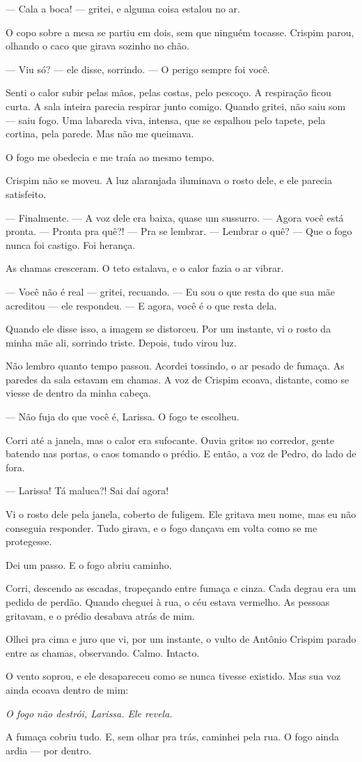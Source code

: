 — Cala a boca! — gritei, e alguma coisa estalou no ar.

O copo sobre a mesa se partiu em dois, sem que ninguém tocasse.  
Crispim parou, olhando o caco que girava sozinho no chão.

— Viu só? — ele disse, sorrindo. — O perigo sempre foi você.

\medskip

Senti o calor subir pelas mãos, pelas costas, pelo pescoço.  
A respiração ficou curta.  
A sala inteira parecia respirar junto comigo.  
Quando gritei, não saiu som — saiu fogo.  
Uma labareda viva, intensa, que se espalhou pelo tapete, pela cortina, pela parede.  
Mas não me queimava.

O fogo me obedecia e me traía ao mesmo tempo.

Crispim não se moveu.  
A luz alaranjada iluminava o rosto dele, e ele parecia satisfeito.

— Finalmente. — A voz dele era baixa, quase um sussurro. — Agora você está pronta.  
— Pronta pra quê?!  
— Pra se lembrar.
— Lembrar o quê?  
— Que o fogo nunca foi castigo. Foi herança.

As chamas cresceram.  
O teto estalava, e o calor fazia o ar vibrar.

— Você não é real — gritei, recuando.  
— Eu sou o que resta do que sua mãe acreditou — ele respondeu. — E agora, você é o que resta dela.

Quando ele disse isso, a imagem se distorceu.  
Por um instante, vi o rosto da minha mãe ali, sorrindo triste.  
Depois, tudo virou luz.

\medskip

Não lembro quanto tempo passou.  
Acordei tossindo, o ar pesado de fumaça.  
As paredes da sala estavam em chamas.  
A voz de Crispim ecoava, distante, como se viesse de dentro da minha cabeça.

— Não fuja do que você é, Larissa. O fogo te escolheu.  

Corri até a janela, mas o calor era sufocante.  
Ouvia gritos no corredor, gente batendo nas portas, o caos tomando o prédio.  
E então, a voz de Pedro, do lado de fora.

— Larissa! Tá maluca?! Sai daí agora!  

Vi o rosto dele pela janela, coberto de fuligem.  
Ele gritava meu nome, mas eu não conseguia responder.  
Tudo girava, e o fogo dançava em volta como se me protegesse.

Dei um passo.  
E o fogo abriu caminho.

Corri, descendo as escadas, tropeçando entre fumaça e cinza.  
Cada degrau era um pedido de perdão.  
Quando cheguei à rua, o céu estava vermelho.  
As pessoas gritavam, e o prédio desabava atrás de mim.

Olhei pra cima e juro que vi, por um instante, o vulto de Antônio Crispim parado entre as chamas, observando.  
Calmo.  
Intacto.

O vento soprou, e ele desapareceu como se nunca tivesse existido.  
Mas sua voz ainda ecoava dentro de mim:

\emph{O fogo não destrói, Larissa. Ele revela.}

A fumaça cobriu tudo.  
E, sem olhar pra trás, caminhei pela rua.  
O fogo ainda ardia — por dentro.
